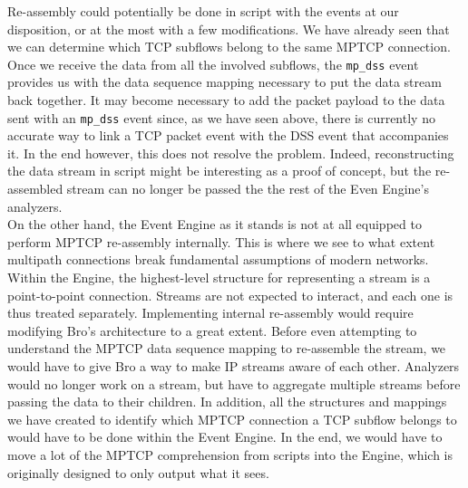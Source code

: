 Re-assembly could potentially be done in script with the events at our disposition, or at the most with a few modifications. We have already seen that we can determine which TCP subflows belong to the same MPTCP connection. Once we receive the data from all the involved subflows, the \texttt{mp\_dss} event provides us with the data sequence mapping necessary to put the data stream back together. It may become necessary to add the packet payload to the data sent with an \texttt{mp\_dss} event since, as we have seen above, there is currently no accurate way to link a TCP packet event with the DSS event that accompanies it. In the end however, this does not resolve the problem. Indeed, reconstructing the data stream in script might be interesting as a proof of concept, but the re-assembled stream can no longer be passed the the rest of the Even Engine's analyzers. \\

On the other hand, the Event Engine as it stands is not at all equipped to perform MPTCP re-assembly internally. This is where we see to what extent multipath connections break fundamental assumptions of modern networks. Within the Engine, the highest-level structure for representing a stream is a point-to-point connection. Streams are not expected to interact, and each one is thus treated separately. Implementing internal re-assembly would require modifying Bro's architecture to a great extent. Before even attempting to understand the MPTCP data sequence mapping to re-assemble the stream, we would have to give Bro a way to make IP streams aware of each other. Analyzers would no longer work on a stream, but have to aggregate multiple streams before passing the data to their children. In addition, all the structures and mappings we have created to identify which MPTCP connection a TCP subflow belongs to would have to be done within the Event Engine. In the end, we would have to move a lot of the MPTCP comprehension from scripts into the Engine, which is originally designed to only output what it sees.
